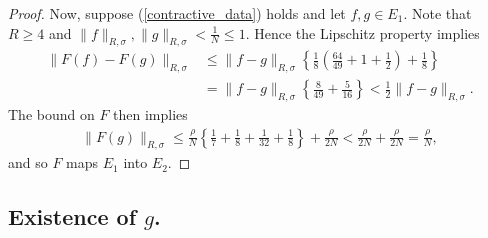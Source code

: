 \begin{proof}
Now, suppose (\ref{contractive_data}) holds and let $f,g\in E_1$. Note that $R\geq4$ and $\|f\|_{R,\sigma},\|g\|_{R,\sigma}<\frac{1}{N}\leq 1$. Hence the Lipschitz property implies
	\begin{align*}
		\|F(f)-F(g)\|_{R,\sigma} &\leq \|f-g\|_{R,\sigma}\left\{ \frac{1}{8}\left( \frac{64}{49}+1+\frac{1}{2}\right)+\frac{1}{8}\right\}\\
			&=\|f-g\|_{R,\sigma} \left\{\frac{8}{49}+\frac{5}{16}\right\}< \frac{1}{2}\|f-g\|_{R,\sigma}.
	\end{align*}
The bound on $F$ then implies
	\begin{align*}
		\|F(g)\|_{R,\sigma} \leq \frac{\rho}{N}\left\{ \frac{1}{7}+\frac{1}{8}+\frac{1}{32}+\frac{1}{8}\right\}+\frac{\rho}{2N}<\frac{\rho}{2N}+\frac{\rho}{2N}=\frac{\rho}{N},
	\end{align*}
and so $F$ maps $E_1$ into $E_2$.
\end{proof}




\subsection{Existence of $g$.}\label{existence_of_g}


